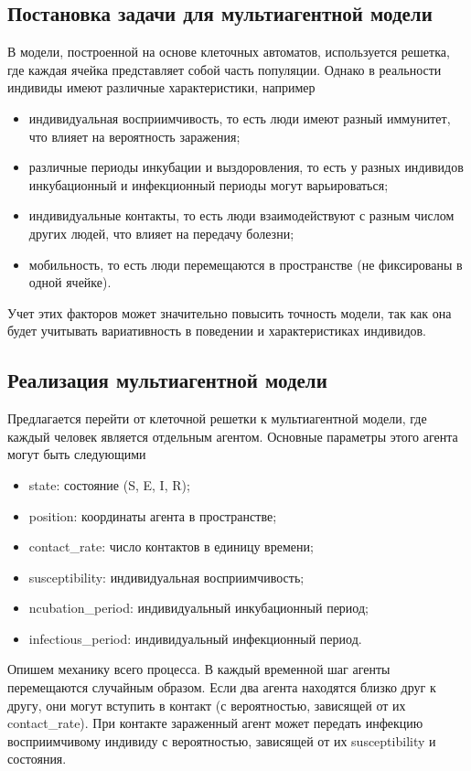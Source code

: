 \documentclass[a4paper, 14pt]{extreport}
\begin{document}
	\subsection{Постановка задачи для мультиагентной модели}
	В модели, построенной на основе клеточных автоматов, используется решетка, где каждая ячейка представляет собой часть популяции. Однако в реальности индивиды имеют различные характеристики, например
	\begin{itemize}
		\item индивидуальная восприимчивость, то есть люди имеют разный иммунитет, что влияет на вероятность заражения;
		\item различные периоды инкубации и выздоровления, то есть у разных индивидов инкубационный и инфекционный периоды могут варьироваться;
		\item индивидуальные контакты, то есть люди взаимодействуют с разным числом других людей, что влияет на передачу болезни;
		\item мобильность, то есть люди перемещаются в пространстве (не фиксированы в одной ячейке).
	\end{itemize}
	
	Учет этих факторов может значительно повысить точность модели, так как она будет учитывать вариативность в поведении и характеристиках индивидов.
	
	\subsection{Реализация мультиагентной модели}
	
	Предлагается перейти от клеточной решетки к мультиагентной модели, где каждый человек является отдельным агентом. Основные параметры этого агента могут быть следующими
	\begin{itemize}
		\item state: состояние (S, E, I, R);
		\item position: координаты агента в пространстве;
		\item contact\_rate: число контактов в единицу времени;
		\item susceptibility: индивидуальная восприимчивость;
		\item ncubation\_period: индивидуальный инкубационный период;
		\item infectious\_period: индивидуальный инфекционный период.
	\end{itemize}
	
	Опишем механику всего процесса. В каждый временной шаг агенты перемещаются случайным образом. Если два агента находятся близко друг к другу, они могут вступить в контакт (с вероятностью, зависящей от их contact\_rate).
	При контакте зараженный агент может передать инфекцию восприимчивому индивиду с вероятностью, зависящей от их susceptibility и состояния.
	
\end{document}
